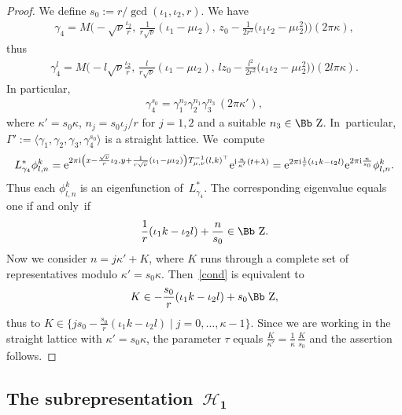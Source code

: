 \documentclass[10pt,a4paper]{amsart}
\newcommand\ZZ{{\mbox{\Bb Z}}}
\newcommand\cH{{\mathcal H}}
\newcommand\la{\langle}
\newcommand\ra{\rangle}
\numberwithin{equation}{section}
\begin{document}
\begin{proof} We define $s_0:=r/\gcd(\iota_1,\iota_2,r)$.
We have
\begin{gather*}
\gamma_4=M\bigg({-}\sqrt\nu\frac{\iota_2}{r},\,\frac{1}{r\sqrt\nu}(\iota_1-\mu\iota_2), \, z_0-\frac{1}{2r^2}\big(\iota_1\iota_2-\mu\iota_2^2\big)\bigg)(2\pi\kappa),
\end{gather*}
thus
\begin{gather*}
\gamma_4^l=M\bigg({-}l\sqrt\nu\frac{\iota_2}{r},\,\frac{l}{r\sqrt\nu}(\iota_1-\mu\iota_2),\, lz_0-\frac{l^2}{2r^2}\big(\iota_1\iota_2-\mu\iota_2^2\big)\bigg)(2l\pi\kappa).
\end{gather*}
In particular,
\begin{gather*}
\gamma_4^{s_0}=\gamma_1^{n_2}\gamma_2^{n_1}\gamma_3^{n_3}\,(2\pi\kappa'),
\end{gather*}
where $\kappa'=s_0\kappa$, $n_j=s_0\iota_j/r$ for $j=1,2$ and a suitable $n_3\in\ZZ$. In~particular, $\Gamma':=\la \gamma_1, \gamma_2, \gamma_3, \gamma_4^{s_0}\ra$ is a straight lattice. We~compute
\begin{gather*}
L_{\gamma_4}^* \phi^k_{l,n}= {\rm e}^{2\pi {\rm i}\left(x-\frac{\sqrt\nu}r\iota_2,y+\frac 1{r\sqrt\nu}(\iota_1-\mu \iota_2)\right)T_{\mu,\nu}^{-1}( l,k)^\top}{\rm e}^{{\rm i} \frac n{\kappa'} ( t+\lambda)}
= {\rm e}^{2\pi {\rm i} \frac 1r(\iota_1k-\iota_2l)} {\rm e}^{2\pi {\rm i} \frac n{s_0}} \phi^k_{l,n}.
\end{gather*}
Thus each $\phi^k_{l,n}$ is an eigenfunction of~$L_{\gamma_4}^*$. The corresponding eigenvalue equals one if and only~if
\begin{gather}\label{cond}
\frac1r(\iota_1k-\iota_2l)+\frac n{s_0}\in\ZZ.
\end{gather}
Now we consider $n=j\kappa'+K$, where $K$ runs through a complete set of representatives modulo $\kappa'=s_0\kappa$. Then~\eqref{cond} is equivalent to
\begin{gather*}
 K\in -\frac{s_0}r(\iota_1k-\iota_2l)+s_0\ZZ,
 \end{gather*}
thus to $K\in\big\{js_0-\frac{s_0}r(\iota_1k-\iota_2l)\mid j=0,\dots,\kappa-1\big\}$. Since we are working in the straight lattice with $\kappa'=s_0\kappa$, the parameter $\tau$ equals $\frac K{\kappa'}=\frac 1\kappa \, \frac K{s_0}$ and the assertion follows.
\end{proof}
%
\subsection[The subrepresentation~$\cH_1$]{The subrepresentation~$\boldsymbol{\cH_1}$}
\end{document}
